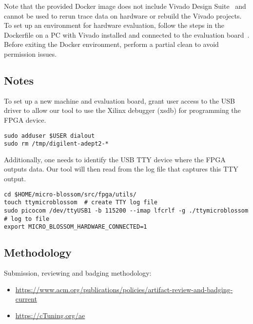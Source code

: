 Note that the provided Docker image does not include Vivado Design Suite~\cite{vivado2023} and cannot be used to rerun trace data on hardware or rebuild the Vivado projects.
To set up an environment for hardware evaluation, follow the steps in the Dockerfile on a PC with Vivado installed and connected to the evaluation board~\cite{vmk180}.
Before exiting the Docker environment, perform a partial clean to avoid permission issues.

\subsection{Notes}

To set up a new machine and evaluation board, grant user access to the USB driver to allow our tool to use the Xilinx debugger (xsdb) for programming the FPGA device.

\begin{verbatim}
sudo adduser $USER dialout
sudo rm /tmp/digilent-adept2-*
\end{verbatim}

Additionally, one needs to identify the USB TTY device where the FPGA outputs data.
Our tool will then read from the log file that captures this TTY output.

\begin{verbatim}
cd $HOME/micro-blossom/src/fpga/utils/
touch ttymicroblossom  # create TTY log file
sudo picocom /dev/ttyUSB1 -b 115200 --imap lfcrlf -g ./ttymicroblossom  # log to file
export MICRO_BLOSSOM_HARDWARE_CONNECTED=1
\end{verbatim}

\subsection{Methodology}

Submission, reviewing and badging methodology:

\begin{itemize}
  \item \small\url{https://www.acm.org/publications/policies/artifact-review-and-badging-current}
  \item \url{https://cTuning.org/ae}
\end{itemize}
